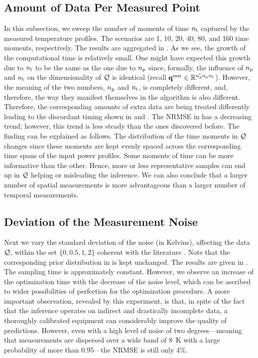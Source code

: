 \subsection{Amount of Data Per Measured Point}
In this subsection, we sweep the number of moments of time ${n_\text{t}}$ captured by the measured temperature profiles.
The scenarios are 1, 10, 20, 40, 80, and 160 time moments, respectively.
The results are aggregated in .
As we see, the growth of the computational time is relatively small.
One might have expected this growth due to ${n_\text{t}}$ to be the same as the one due to ${n_\text{p}}$ since, formally, the influence of ${n_\text{p}}$ and ${n_\text{t}}$ on the dimensionality of $\mathcal{Q}$ is identical (recall $\mathbf{q}^{\text{msr}} \in \mathbb{R}^{{n_\text{d}'} {n_\text{p}} {n_\text{t}}}$).
However, the meaning of the two numbers, ${n_\text{p}}$ and ${n_\text{t}}$, is completely different, and, therefore, the way they manifest themselves in the algorithm is also different.
Therefore, the corresponding amounts of extra data are being treated differently leading to the discordant timing shown in  and .
The NRMSE in  has a decreasing trend; however, this trend is less steady than the ones discovered before. The finding can be explained as follows.
The distribution of the time moments in $\mathcal{Q}$ changes since these moments are kept evenly spaced across the corresponding time spans of the input power profiles.
Some moments of time can be more informative than the other.
Hence, more or less representative samples can end up in $\mathcal{Q}$ helping or misleading the inference.
We can also conclude that a larger number of spatial measurements is more advantageous than a larger number of temporal measurements.

\subsection{Deviation of the Measurement Noise}
Next we vary the standard deviation of the noise (in Kelvins), affecting the data $\mathcal{Q}$, within the set $\{ 0, 0.5, 1, 2 \}$ coherent with the literature \cite{mesa-martinez2007}. Note that the corresponding prior distribution in  is kept unchanged. The results are given in .
The sampling time is approximately constant. However, we observe an increase of the optimization time with the decrease of the noise level, which can be ascribed to wider possibilities of perfection for the optimization procedure.
A more important observation, revealed by this experiment, is that, in spite of the fact that the inference operates on indirect and drastically incomplete data, a thoroughly calibrated equipment can considerably improve the quality of predictions.
However, even with a high level of noise of two degrees---meaning that measurements are dispersed over a wide band of 8~K with a large probability of more than 0.95---the NRMSE is still only 4\%.

